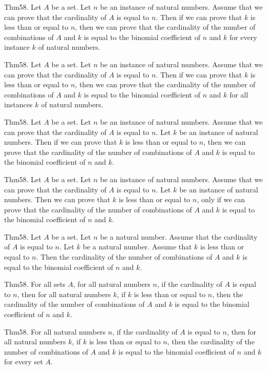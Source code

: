 \documentclass{article}
\begin{document}
Thm58. Let $A$ be a set. Let $n$ be an instance of natural numbers. Assume that we can prove that the cardinality of $A$ is equal to $n$. Then if we can prove that $k$ is less than or equal to $n$, then we can prove that the cardinality of the number of combinations of $A$ and $k$ is equal to the binomial coefficient of $n$ and $k$ for every instance $k$ of natural numbers.

Thm58. Let $A$ be a set. Let $n$ be an instance of natural numbers. Assume that we can prove that the cardinality of $A$ is equal to $n$. Then if we can prove that $k$ is less than or equal to $n$, then we can prove that the cardinality of the number of combinations of $A$ and $k$ is equal to the binomial coefficient of $n$ and $k$ for all instances $k$ of natural numbers.

Thm58. Let $A$ be a set. Let $n$ be an instance of natural numbers. Assume that we can prove that the cardinality of $A$ is equal to $n$. Let $k$ be an instance of natural numbers. Then if we can prove that $k$ is less than or equal to $n$, then we can prove that the cardinality of the number of combinations of $A$ and $k$ is equal to the binomial coefficient of $n$ and $k$.

Thm58. Let $A$ be a set. Let $n$ be an instance of natural numbers. Assume that we can prove that the cardinality of $A$ is equal to $n$. Let $k$ be an instance of natural numbers. Then we can prove that $k$ is less than or equal to $n$, only if we can prove that the cardinality of the number of combinations of $A$ and $k$ is equal to the binomial coefficient of $n$ and $k$.

Thm58. Let $A$ be a set. Let $n$ be a natural number. Assume that the cardinality of $A$ is equal to $n$. Let $k$ be a natural number. Assume that $k$ is less than or equal to $n$. Then the cardinality of the number of combinations of $A$ and $k$ is equal to the binomial coefficient of $n$ and $k$.

Thm58. For all sets $A$, for all natural numbers $n$, if the cardinality of $A$ is equal to $n$, then for all natural numbers $k$, if $k$ is less than or equal to $n$, then the cardinality of the number of combinations of $A$ and $k$ is equal to the binomial coefficient of $n$ and $k$.

Thm58. For all natural numbers $n$, if the cardinality of $A$ is equal to $n$, then for all natural numbers $k$, if $k$ is less than or equal to $n$, then the cardinality of the number of combinations of $A$ and $k$ is equal to the binomial coefficient of $n$ and $k$ for every set $A$.
\end{document}
